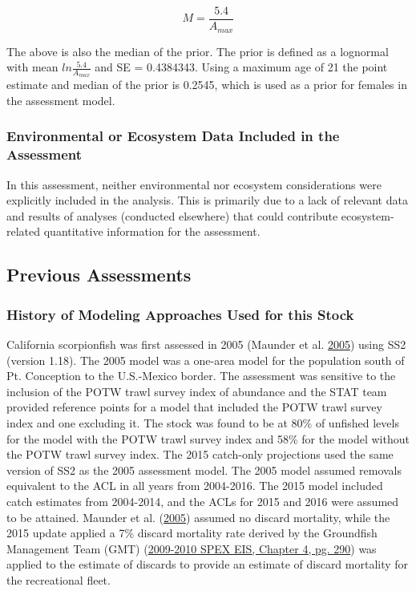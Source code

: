 \documentclass[12pt,]{article}
\begin{document}
\begin{equation}
M = \frac{5.4}{A_{max}}
\end{equation}

The above is also the median of the prior. The prior is defined as a
lognormal with mean \(ln\frac{5.4}{A_{max}}\) and SE = 0.4384343. Using
a maximum age of 21 the point estimate and median of the prior is
0.2545, which is used as a prior for females in the assessment model.

\vspace{.5cm}

\subsubsection{Environmental or Ecosystem Data Included in the
Assessment}\label{environmental-or-ecosystem-data-included-in-the-assessment}

In this assessment, neither environmental nor ecosystem considerations
were explicitly included in the analysis. This is primarily due to a
lack of relevant data and results of analyses (conducted elsewhere) that
could contribute ecosystem-related quantitative information for the
assessment.

\subsection{Previous Assessments}\label{previous-assessments}

\subsubsection{History of Modeling Approaches Used for this
Stock}\label{history-of-modeling-approaches-used-for-this-stock}

California scorpionfish was first assessed in 2005 (Maunder et al.
\protect\hyperlink{ref-Maunder2005}{2005}) using SS2 (version 1.18). The
2005 model was a one-area model for the population south of Pt.
Conception to the U.S.-Mexico border. The assessment was sensitive to
the inclusion of the POTW trawl survey index of abundance and the STAT
team provided reference points for a model that included the POTW trawl
survey index and one excluding it. The stock was found to be at 80\% of
unfished levels for the model with the POTW trawl survey index and 58\%
for the model without the POTW trawl survey index. The 2015 catch-only
projections used the same version of SS2 as the 2005 assessment model.
The 2005 model assumed removals equivalent to the ACL in all years from
2004-2016. The 2015 model included catch estimates from 2004-2014, and
the ACLs for 2015 and 2016 were assumed to be attained. Maunder et al.
(\protect\hyperlink{ref-Maunder2005}{2005}) assumed no discard
mortality, while the 2015 update applied a 7\% discard mortality rate
derived by the Groundfish Management Team (GMT)
(\href{http://www.pcouncil.org/wp-content/uploads/chp4_0910.pdf}{2009-2010
SPEX EIS, Chapter 4, pg. 290}) was applied to the estimate of discards
to provide an estimate of discard mortality for the recreational fleet.
\end{document}
